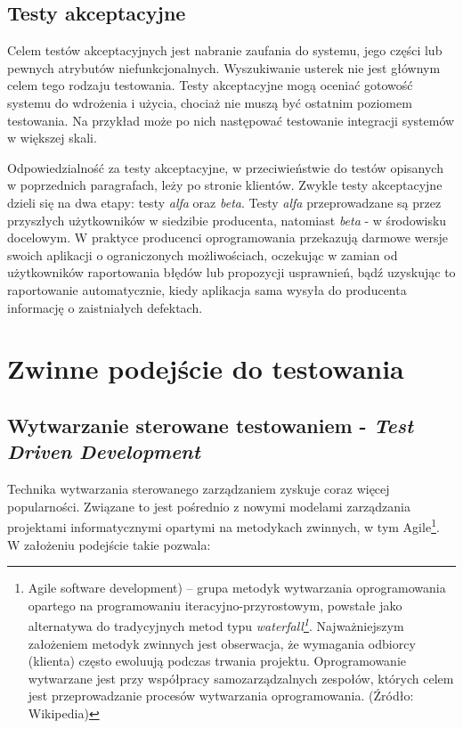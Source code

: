 \subsection{Testy akceptacyjne}

Celem testów akceptacyjnych jest nabranie zaufania do systemu, jego części lub pewnych atrybutów niefunkcjonalnych. Wyszukiwanie usterek nie jest głównym celem tego rodzaju testowania. Testy akceptacyjne mogą oceniać gotowość systemu do wdrożenia i użycia, chociaż nie muszą być ostatnim poziomem testowania. Na przykład może po nich następować testowanie integracji systemów w większej skali.

Odpowiedzialność za testy akceptacyjne, w przeciwieństwie do testów opisanych w poprzednich paragrafach, leży po stronie klientów. Zwykle testy akceptacyjne dzieli się na dwa etapy: testy \textit{alfa} oraz \textit{beta}. Testy \textit{alfa} przeprowadzane są przez przyszłych użytkowników w siedzibie producenta, natomiast \textit{beta} - w środowisku docelowym. W praktyce producenci oprogramowania przekazują darmowe wersje swoich aplikacji o ograniczonych możliwościach, oczekując w zamian od użytkowników raportowania błędów lub propozycji usprawnień, bądź uzyskując to raportowanie automatycznie, kiedy aplikacja sama wysyła do producenta informację o zaistniałych defektach.\cite{bib:sylabus:foundation}

\section{Zwinne podejście do testowania}
\subsection{Wytwarzanie sterowane testowaniem - \textit{Test Driven Development}}
\label{test_driven_development}
Technika wytwarzania sterowanego zarządzaniem zyskuje coraz więcej popularności. Związane to jest pośrednio z nowymi modelami zarządzania projektami informatycznymi opartymi na metodykach zwinnych, w tym Agile\footnote{Agile software development) – grupa metodyk wytwarzania oprogramowania opartego na programowaniu iteracyjno-przyrostowym, powstałe jako alternatywa do tradycyjnych metod typu \textit{waterfall\footnote{Iteracyjny model kaskadowy (ang. waterfall model) – jeden z kilku rodzajów procesów tworzenia oprogramowania zdefiniowany w inżynierii oprogramowania. Polega on na wykonywaniu podstawowych czynności jako odrębnych faz projektowych, w porządku jeden po drugim. Każda czynność to kolejny schodek (kaskada). Jeśli któraś z faz zwróci niesatysfakcjonujący produkt, należy się cofnąć wykonując kolejne iteracje aż do momentu kiedy otrzymano satysfakcjonujący produkt na końcu schodków. Źródło: Wikipedia}}. Najważniejszym założeniem metodyk zwinnych jest obserwacja, że wymagania odbiorcy (klienta) często ewoluują podczas trwania projektu. Oprogramowanie wytwarzane jest przy współpracy samozarządzalnych zespołów, których celem jest przeprowadzanie procesów wytwarzania oprogramowania. (Źródło: Wikipedia) }. W założeniu podejście takie pozwala:

